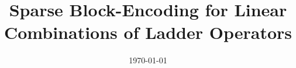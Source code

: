 






\title{Sparse Block-Encoding for Linear Combinations of Ladder Operators}

\date{\today} 


 

\maketitle










\appendix


